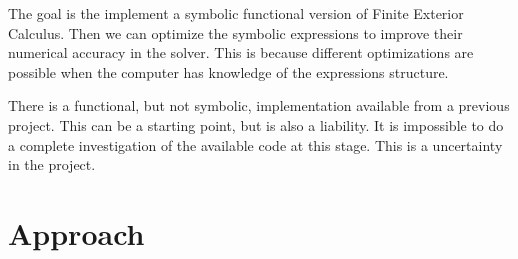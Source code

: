 \documentclass{scrartcl}
\begin{document}
The goal is the implement a symbolic functional version of Finite Exterior
Calculus.  Then we can optimize the symbolic expressions to improve their
numerical accuracy in the solver. This is because different optimizations are
possible when the computer has knowledge of the expressions structure.






There is a functional, but not symbolic, implementation available from
a previous project. This can be a starting point, but is also a liability.
It is impossible to do a complete investigation of the available code at this stage.  This is a uncertainty in the project.


\section{Approach}


\end{document}
